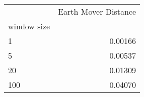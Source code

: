 \begin{tabular}{lr}
\toprule
{} &  Earth Mover Distance \\
window size &                       \\
\midrule
1           &               0.00166 \\
5           &               0.00537 \\
20          &               0.01309 \\
100         &               0.04070 \\
\bottomrule
\end{tabular}
